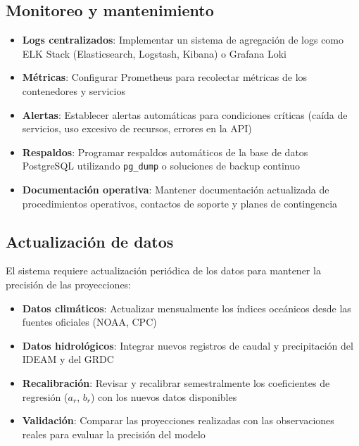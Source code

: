 \subsection{Monitoreo y mantenimiento}
\label{subsec:chp7-6-2}

\begin{itemize}
    \item \textbf{Logs centralizados}: Implementar un sistema de agregación de logs como ELK Stack (Elasticsearch, Logstash, Kibana) o Grafana Loki
    \item \textbf{Métricas}: Configurar Prometheus para recolectar métricas de los contenedores y servicios
    \item \textbf{Alertas}: Establecer alertas automáticas para condiciones críticas (caída de servicios, uso excesivo de recursos, errores en la API)
    \item \textbf{Respaldos}: Programar respaldos automáticos de la base de datos PostgreSQL utilizando \lstinline[style=bash]|pg_dump| o soluciones de backup continuo
    \item \textbf{Documentación operativa}: Mantener documentación actualizada de procedimientos operativos, contactos de soporte y planes de contingencia
\end{itemize}

\subsection{Actualización de datos}
\label{subsec:chp7-6-3}

El sistema requiere actualización periódica de los datos para mantener la precisión de las proyecciones:

\begin{itemize}
    \item \textbf{Datos climáticos}: Actualizar mensualmente los índices oceánicos desde las fuentes oficiales (NOAA, CPC)
    \item \textbf{Datos hidrológicos}: Integrar nuevos registros de caudal y precipitación del IDEAM\cite{ideam_dhime_atencionciudadano} y del GRDC\cite{grdc_portal}
    \item \textbf{Recalibración}: Revisar y recalibrar semestralmente los coeficientes de regresión ($a_r$, $b_r$) con los nuevos datos disponibles
    \item \textbf{Validación}: Comparar las proyecciones realizadas con las observaciones reales para evaluar la precisión del modelo
\end{itemize}

